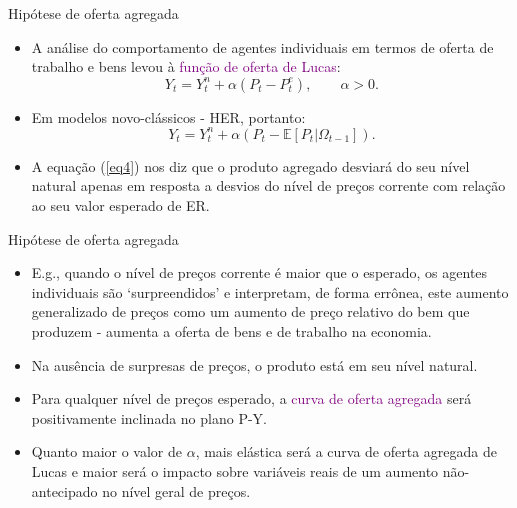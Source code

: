 \documentclass[10pt]{beamer}
\begin{document}
\begin{frame}{Hipótese de oferta agregada}
    \begin{itemize}
        \item A análise do comportamento de agentes individuais em termos de oferta de trabalho e bens levou à \textcolor{purple}{função de oferta de Lucas}:
        \begin{equation}
            Y_t = Y_t^n + \alpha(P_t - P_t^e), \qquad \alpha > 0.
            \label{eq3}
        \end{equation}
        \bigskip
        \item Em modelos novo-clássicos - HER, portanto:
        \begin{equation}
            Y_t = Y_t^n + \alpha\left(P_t - \mathbb{E}[P_t|\Omega_{t-1}]\right).
            \label{eq4}
        \end{equation}
        \bigskip
        \item A equação (\ref{eq4}) nos diz que o produto agregado desviará do seu nível natural apenas em resposta a desvios do nível de preços corrente com relação ao seu valor esperado de ER.
    \end{itemize}
\end{frame}

\begin{frame}{Hipótese de oferta agregada}
    \begin{itemize}
        \item E.g., quando o nível de preços corrente é maior que o esperado, os agentes individuais são `surpreendidos' e interpretam, de forma errônea, este aumento generalizado de preços como um aumento de preço relativo do bem que produzem - aumenta a oferta de bens e de trabalho na economia.
        \bigskip
        \item Na ausência de surpresas de preços, o produto está em seu nível natural.
        \bigskip
        \item Para qualquer nível de preços esperado, a \textcolor{purple}{curva de oferta agregada} será positivamente inclinada no plano P-Y.
        \bigskip
        \item Quanto maior o valor de $\alpha$, mais elástica será a curva de oferta agregada de Lucas e maior será o impacto sobre variáveis reais de um aumento não-antecipado no nível geral de preços.
    \end{itemize}
\end{frame}
\end{document}
